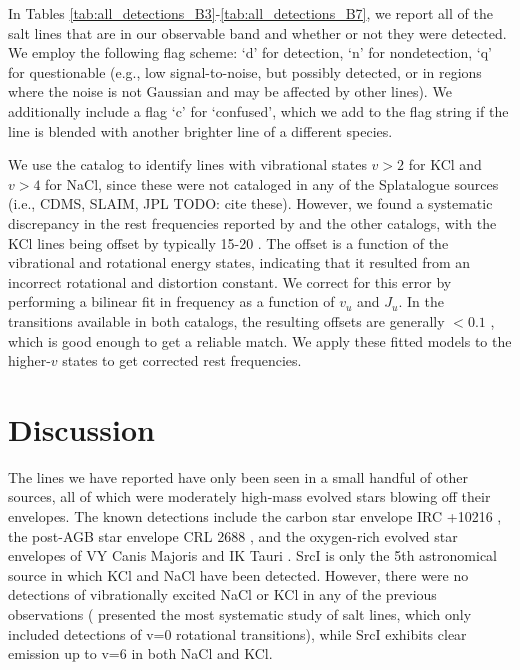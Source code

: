 \documentclass[twocolumn]{aastex62}
\newcommand{\sourcei}{SrcI\xspace}
\begin{document}
In Tables \ref{tab:all_detections_B3}-\ref{tab:all_detections_B7}, we report
all of the salt lines that are in our observable band and whether or not they were
detected.  We employ the following
flag scheme:
`d' for detection, `n' for nondetection, `q' for questionable (e.g., low
signal-to-noise, but possibly detected, or in regions where the noise is
not Gaussian and may be affected by other lines).
We additionally include a flag `c' for `confused', which we add to the flag
string if the line is blended with another brighter line of a different species.

We use the \citet{Barton2014a} catalog to identify lines with vibrational
states $v>2$ for KCl and $v>4$ for NaCl, since these were not cataloged in any
of the Splatalogue sources (i.e., CDMS, SLAIM, JPL {\color{red}TODO: cite
these}).   However, we found a systematic discrepancy in the rest frequencies
reported by \citet{Barton2014a} and the other catalogs, with the KCl lines
being offset by typically 15-20 \kms.  The offset is a function of the vibrational
and rotational energy states, indicating that it resulted from an incorrect rotational
and distortion constant.  We correct for this error by performing a bilinear fit
in frequency as a function of $v_u$ and $J_u$.  In the transitions available
in both catalogs, the resulting offsets are generally $<0.1$ \kms, which is
good enough to get a reliable match.  We apply these fitted models to the
higher-$v$ states to get corrected rest frequencies.










\section{Discussion}
The lines we have reported have only been seen in a small handful of other sources,
all of which were moderately high-mass evolved stars blowing off their envelopes.
The known detections include the carbon star envelope IRC +10216 \citep{Cernicharo1987a},
the post-AGB star envelope CRL 2688 \citep{Highberger2003a}, and the oxygen-rich
evolved star envelopes of VY Canis Majoris and IK Tauri \citep{Milam2007a}.
\sourcei is only the 5th astronomical source in which KCl and NaCl have been
detected.
However, there were no detections of vibrationally excited NaCl or KCl in any
of the previous observations (\citealt{Agundez2012a} presented the most
systematic study of salt lines, which only included detections of v=0
rotational transitions),
while \sourcei exhibits clear emission up to v=6 in both NaCl and KCl.
\end{document}
